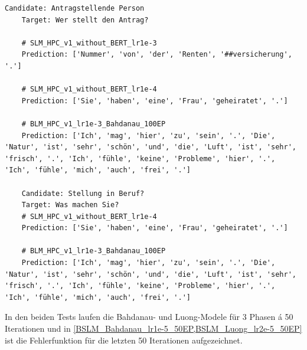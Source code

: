 \begin{lstlisting}[label=overfitting,caption={Beispiele für Overfitting}]
	Candidate: Antragstellende Person
	Target: Wer stellt den Antrag?
	
	# SLM_HPC_v1_without_BERT_lr1e-3
	Prediction: ['Nummer', 'von', 'der', 'Renten', '##versicherung', '.']
	
	# SLM_HPC_v1_without_BERT_lr1e-4
	Prediction: ['Sie', 'haben', 'eine', 'Frau', 'geheiratet', '.']
	
	# BLM_HPC_v1_lr1e-3_Bahdanau_100EP
	Prediction: ['Ich', 'mag', 'hier', 'zu', 'sein', '.', 'Die', 'Natur', 'ist', 'sehr', 'schön', 'und', 'die', 'Luft', 'ist', 'sehr', 'frisch', '.', 'Ich', 'fühle', 'keine', 'Probleme', 'hier', '.', 'Ich', 'fühle', 'mich', 'auch', 'frei', '.']
	
	Candidate: Stellung in Beruf?
	Target: Was machen Sie?
	# SLM_HPC_v1_without_BERT_lr1e-4
	Prediction: ['Sie', 'haben', 'eine', 'Frau', 'geheiratet', '.']
	
	# BLM_HPC_v1_lr1e-3_Bahdanau_100EP
	Prediction: ['Ich', 'mag', 'hier', 'zu', 'sein', '.', 'Die', 'Natur', 'ist', 'sehr', 'schön', 'und', 'die', 'Luft', 'ist', 'sehr', 'frisch', '.', 'Ich', 'fühle', 'keine', 'Probleme', 'hier', '.', 'Ich', 'fühle', 'mich', 'auch', 'frei', '.']
\end{lstlisting}

In den beiden Tests laufen die Bahdanau- und Luong-Modele für 3 Phasen á 50 Iterationen und in \cref{BSLM_Bahdanau_lr1e-5_50EP,BSLM_Luong_lr2e-5_50EP} ist die Fehlerfunktion für die letzten 50 Iterationen aufgezeichnet.


